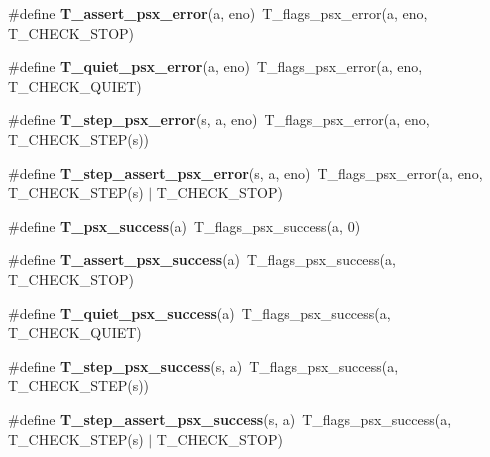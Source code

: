 \begin{DoxyCompactItemize}
\item 
\mbox{\label{group__RTEMSTestFrameworkChecksPSX_ga003677f61478a2a5a2100ade4cbd8a0b}} 
\#define {\bfseries T\+\_\+assert\+\_\+psx\+\_\+error}(a,  eno)~T\+\_\+flags\+\_\+psx\+\_\+error(a, eno, T\+\_\+\+C\+H\+E\+C\+K\+\_\+\+S\+T\+OP)
\item 
\mbox{\label{group__RTEMSTestFrameworkChecksPSX_gae3b730ea8bda2671fb1b8c38d73fc673}} 
\#define {\bfseries T\+\_\+quiet\+\_\+psx\+\_\+error}(a,  eno)~T\+\_\+flags\+\_\+psx\+\_\+error(a, eno, T\+\_\+\+C\+H\+E\+C\+K\+\_\+\+Q\+U\+I\+ET)
\item 
\mbox{\label{group__RTEMSTestFrameworkChecksPSX_gade8a72e9e844afb8705c177898764353}} 
\#define {\bfseries T\+\_\+step\+\_\+psx\+\_\+error}(s,  a,  eno)~T\+\_\+flags\+\_\+psx\+\_\+error(a, eno, T\+\_\+\+C\+H\+E\+C\+K\+\_\+\+S\+T\+EP(s))
\item 
\mbox{\label{group__RTEMSTestFrameworkChecksPSX_ga08e93e8c6e65f6f374bb8d2ecf1b42dc}} 
\#define {\bfseries T\+\_\+step\+\_\+assert\+\_\+psx\+\_\+error}(s,  a,  eno)~T\+\_\+flags\+\_\+psx\+\_\+error(a, eno, T\+\_\+\+C\+H\+E\+C\+K\+\_\+\+S\+T\+EP(s) $\vert$ T\+\_\+\+C\+H\+E\+C\+K\+\_\+\+S\+T\+OP)
\item 
\mbox{\label{group__RTEMSTestFrameworkChecksPSX_gaea5f1bb9a79ef8c70bc329c9abec634a}} 
\#define {\bfseries T\+\_\+psx\+\_\+success}(a)~T\+\_\+flags\+\_\+psx\+\_\+success(a, 0)
\item 
\mbox{\label{group__RTEMSTestFrameworkChecksPSX_ga39eab7f169666939255028ca43128c79}} 
\#define {\bfseries T\+\_\+assert\+\_\+psx\+\_\+success}(a)~T\+\_\+flags\+\_\+psx\+\_\+success(a, T\+\_\+\+C\+H\+E\+C\+K\+\_\+\+S\+T\+OP)
\item 
\mbox{\label{group__RTEMSTestFrameworkChecksPSX_ga3d51f65ac3732de554e6a8eb29b75f59}} 
\#define {\bfseries T\+\_\+quiet\+\_\+psx\+\_\+success}(a)~T\+\_\+flags\+\_\+psx\+\_\+success(a, T\+\_\+\+C\+H\+E\+C\+K\+\_\+\+Q\+U\+I\+ET)
\item 
\mbox{\label{group__RTEMSTestFrameworkChecksPSX_gab5aaf3566695271d5e5f39c0947a2e54}} 
\#define {\bfseries T\+\_\+step\+\_\+psx\+\_\+success}(s,  a)~T\+\_\+flags\+\_\+psx\+\_\+success(a, T\+\_\+\+C\+H\+E\+C\+K\+\_\+\+S\+T\+EP(s))
\item 
\mbox{\label{group__RTEMSTestFrameworkChecksPSX_ga26a22e6ed9fcd89f2ae43ae39464ce2c}} 
\#define {\bfseries T\+\_\+step\+\_\+assert\+\_\+psx\+\_\+success}(s,  a)~T\+\_\+flags\+\_\+psx\+\_\+success(a, T\+\_\+\+C\+H\+E\+C\+K\+\_\+\+S\+T\+EP(s) $\vert$ T\+\_\+\+C\+H\+E\+C\+K\+\_\+\+S\+T\+OP)
\end{DoxyCompactItemize}
